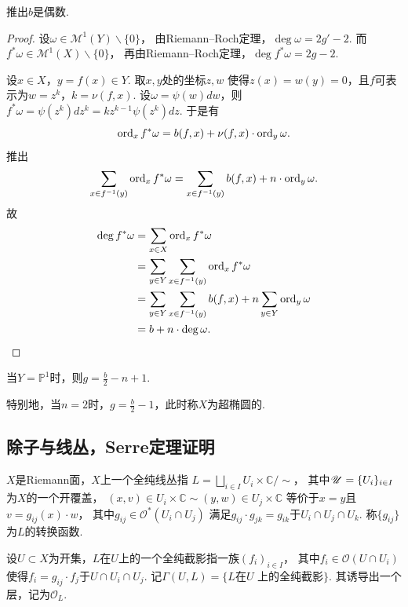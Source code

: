 \begin{remark}
    推出$b$是偶数.
\end{remark}

\begin{proof}
	设$\omega\in \mathscr{M}^1(Y)\backslash \{0\}$，
    由Riemann--Roch定理，$\deg \omega=2g'-2$. 
    而$f^*\omega\in \mathscr{M}^1(X)\backslash \{0\}$，
    再由Riemann--Roch定理，$\deg f^*\omega=2g-2$.

	设$x\in X$，$y=f(x)\in Y$. 取$x, y$处的坐标$z, w$
    使得$z(x)=w(y)=0$，且$f$可表示为$w=z^k$，$k=\nu(f,x)$.
	设$\omega=\psi(w)dw$，则$f^*\omega=\psi(z^k)dz^k=kz^{k-1}\psi(z^k)dz$. 于是有
	$$\operatorname{ord}_x f^*\omega=b(f,x)+\nu(f,x)\cdot \operatorname{ord}_y \omega.$$
	推出
	$$\sum_{x\in f^{-1}(y)}\operatorname{ord}_x f^*\omega
    =\sum_{x\in f^{-1}(y)} b(f,x)+n\cdot \operatorname{ord}_y\omega.$$
	故	
	\begin{align*}
		\deg f^*\omega&=\sum_{x\in X}\operatorname{ord}_x f^*\omega\\
		&=\sum\limits_{y\in Y} \sum_{x\in f^{-1}(y)} \operatorname{ord}_x f^*\omega\\
		&=\sum\limits_{y\in Y}\sum_{x\in f^{-1}(y)} b(f,x)+n\sum_{y\in Y}\operatorname{ord}_y \omega\\
		&=b+n\cdot \deg \omega.
	\end{align*}
\end{proof}

\begin{example}
	当$Y=\mathbb{P}^1$时，则$g=\frac{b}{2}-n+1$.

	特别地，当$n=2$时，$g=\frac{b}{2}-1$，此时称$X$为超椭圆的.
\end{example}


\subsection{除子与线丛，Serre定理证明}	
	
\begin{definition}
	$X$是Riemann面，$X$上一个全纯线丛指
    $L=\bigsqcup\limits_{i\in I} U_i\times \mathbb{C}/\sim$，
    其中$\mathscr{U}=\{U_i\}_{i\in I}$为$X$的一个开覆盖，
    $(x,v)\in U_i\times \mathbb{C}\sim (y,w)\in U_j\times \mathbb{C}$
    等价于$x=y$且$v=g_{ij}(x)\cdot w$，
    其中$g_{ij}\in \mathcal{O}^*(U_i\cap U_j)$
    满足$g_{ij}\cdot g_{jk}=g_{ik}$于$U_i\cap U_j \cap U_k$. 
    称$\{g_{ij}\}$为$L$的转换函数.
\end{definition}

\begin{definition}
	设$U\subset X$为开集，$L$在$U$上的一个全纯截影指一族$(f_i)_{i\in I}$，
    其中$f_i\in \mathcal{O}(U\cap U_i)$
    使得$f_i=g_{ij}\cdot f_j$于$U\cap U_i \cap U_j$. 
    记$\Gamma(U,L)=\{L$在$U\text{ 上的全纯截影}\}$. 其诱导出一个层，记为$\mathcal{O}_L$.
\end{definition}
	
